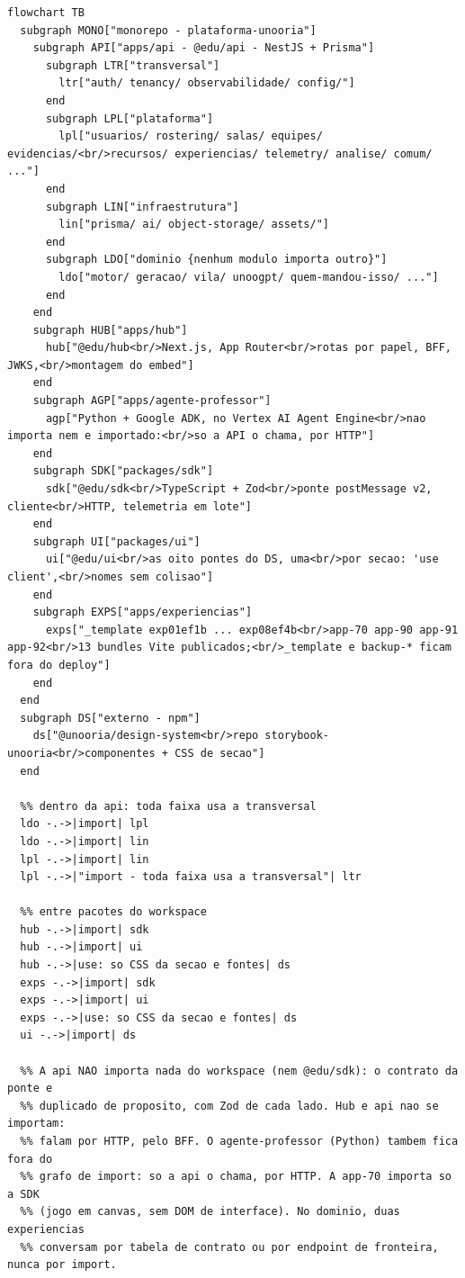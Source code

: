 \begin{lstlisting}[language=mermaid]
%% aproximacao: o Mermaid nao tem diagrama de pacotes; cada pacote vira subgraph, e a dependencia de codigo (import/use) vira seta tracejada rotulada.
flowchart TB
  subgraph MONO["monorepo - plataforma-unooria"]
    subgraph API["apps/api - @edu/api - NestJS + Prisma"]
      subgraph LTR["transversal"]
        ltr["auth/ tenancy/ observabilidade/ config/"]
      end
      subgraph LPL["plataforma"]
        lpl["usuarios/ rostering/ salas/ equipes/ evidencias/<br/>recursos/ experiencias/ telemetry/ analise/ comum/ ..."]
      end
      subgraph LIN["infraestrutura"]
        lin["prisma/ ai/ object-storage/ assets/"]
      end
      subgraph LDO["dominio {nenhum modulo importa outro}"]
        ldo["motor/ geracao/ vila/ unoogpt/ quem-mandou-isso/ ..."]
      end
    end
    subgraph HUB["apps/hub"]
      hub["@edu/hub<br/>Next.js, App Router<br/>rotas por papel, BFF, JWKS,<br/>montagem do embed"]
    end
    subgraph AGP["apps/agente-professor"]
      agp["Python + Google ADK, no Vertex AI Agent Engine<br/>nao importa nem e importado:<br/>so a API o chama, por HTTP"]
    end
    subgraph SDK["packages/sdk"]
      sdk["@edu/sdk<br/>TypeScript + Zod<br/>ponte postMessage v2, cliente<br/>HTTP, telemetria em lote"]
    end
    subgraph UI["packages/ui"]
      ui["@edu/ui<br/>as oito pontes do DS, uma<br/>por secao: 'use client',<br/>nomes sem colisao"]
    end
    subgraph EXPS["apps/experiencias"]
      exps["_template exp01ef1b ... exp08ef4b<br/>app-70 app-90 app-91 app-92<br/>13 bundles Vite publicados;<br/>_template e backup-* ficam fora do deploy"]
    end
  end
  subgraph DS["externo - npm"]
    ds["@unooria/design-system<br/>repo storybook-unooria<br/>componentes + CSS de secao"]
  end

  %% dentro da api: toda faixa usa a transversal
  ldo -.->|import| lpl
  ldo -.->|import| lin
  lpl -.->|import| lin
  lpl -.->|"import - toda faixa usa a transversal"| ltr

  %% entre pacotes do workspace
  hub -.->|import| sdk
  hub -.->|import| ui
  hub -.->|use: so CSS da secao e fontes| ds
  exps -.->|import| sdk
  exps -.->|import| ui
  exps -.->|use: so CSS da secao e fontes| ds
  ui -.->|import| ds

  %% A api NAO importa nada do workspace (nem @edu/sdk): o contrato da ponte e
  %% duplicado de proposito, com Zod de cada lado. Hub e api nao se importam:
  %% falam por HTTP, pelo BFF. O agente-professor (Python) tambem fica fora do
  %% grafo de import: so a api o chama, por HTTP. A app-70 importa so a SDK
  %% (jogo em canvas, sem DOM de interface). No dominio, duas experiencias
  %% conversam por tabela de contrato ou por endpoint de fronteira, nunca por import.
\end{lstlisting}

